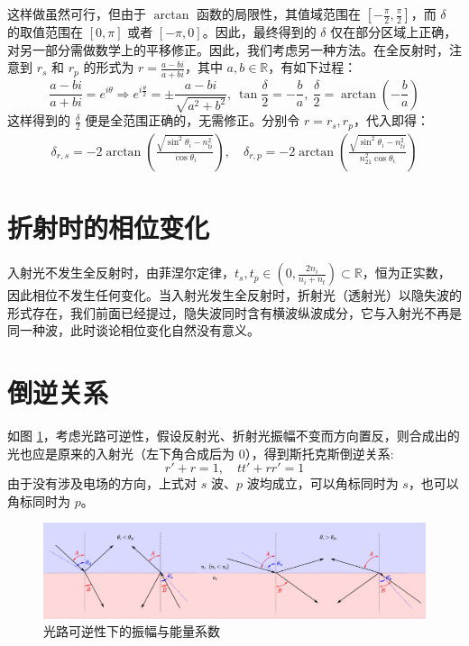 \documentclass[UTF8]{report}
\def\R{\mathbb{R}}
\theoremstyle{MyLineTheoremStyle} %
\theoremstyle{MyBlockTheoremStyle} %
\theoremstyle{MySubsubsectionStyle} %
\begin{document}
这样做虽然可行，但由于 $\arctan $ 函数的局限性，其值域范围在 $[-\frac{\pi}{2}, \frac{\pi}{2}]$，而 $\delta $ 的取值范围在 $[0, \pi]$ 或者 $[-\pi, 0]$。因此，最终得到的 $\delta$ 仅在部分区域上正确，对另一部分需做数学上的平移修正。因此，我们考虑另一种方法。在全反射时，注意到 $r_s$ 和 $r_p$ 的形式为 $r = \frac{a - bi}{a +bi}$，其中 $a, b \in \R$，有如下过程：
\begin{equation}
\frac{a - bi}{a + bi} = e^{i \theta} \Longrightarrow e^{i \frac{\theta}{2}} = \pm \frac{a - bi}{\sqrt{a^2 + b^2} },\ \tan \frac{\delta}{2} = - \frac{b}{a},\ \frac{\delta}{2} = \arctan \left( - \frac{b}{a} \right)
\end{equation}
这样得到的 $\frac{\delta}{2}$ 便是全范围正确的，无需修正。分别令 $r = r_s, r_p$，代入即得：
\begin{gather}
\delta_{r,s} = - 2 \arctan \left( \frac{\sqrt{\sin^2 \theta_i - n_{ti}^2} }{\cos \theta_i} \right) 
,\quad 
\delta_{r,p} = - 2 \arctan \left( \frac{\sqrt{\sin^2 \theta_i - n_{ti}^2} }{n_{21}^2 \cos \theta_i} \right)
\end{gather}

\section{折射时的相位变化}

入射光不发生全反射时，由菲涅尔定律，$t_s, t_p \in (0, \frac{2n_i}{n_i + n_t}) \subset \R$，恒为正实数，因此相位不发生任何变化。当入射光发生全反射时，折射光（透射光）以隐失波的形式存在，我们前面已经提过，隐失波同时含有横波纵波成分，它与入射光不再是同一种波，此时谈论相位变化自然没有意义。

\section{倒逆关系}

如图 \ref{光路可逆性下的振幅与能量系数}，考虑光路可逆性，假设反射光、折射光振幅不变而方向置反，则合成出的光也应是原来的入射光（左下角合成后为 0），得到斯托克斯倒逆关系: 
\begin{equation}\label{斯托克斯倒逆关系}
r' + r = 1,\quad tt' + rr' = 1
\end{equation}
由于没有涉及电场的方向，上式对 $s$ 波、$p$ 波均成立，可以角标同时为 $s$，也可以角标同时为 $p$。

\begin{figure}[H]\centering
    \includegraphics[width=\columnwidth]{assets/3/光路可逆性下的振幅与能量系数.pdf}
    \caption{ 光路可逆性下的振幅与能量系数}\label{光路可逆性下的振幅与能量系数}
\end{figure}
\end{document}
